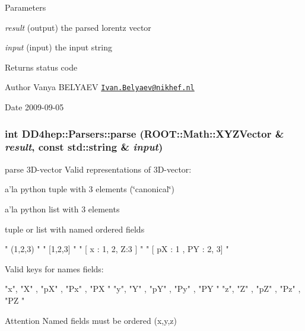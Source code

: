 \begin{DoxyParams}{Parameters}
\item[{\em result}](output) the parsed lorentz vector \item[{\em input}](input) the input string \end{DoxyParams}
\begin{DoxyReturn}{Returns}
status code 
\end{DoxyReturn}
\begin{DoxyAuthor}{Author}
Vanya BELYAEV \href{mailto:Ivan.Belyaev@nikhef.nl}{\tt Ivan.Belyaev@nikhef.nl} 
\end{DoxyAuthor}
\begin{DoxyDate}{Date}
2009-\/09-\/05 
\end{DoxyDate}
\hypertarget{namespace_d_d4hep_1_1_parsers_a55f47fe0c36c09f779f5aeefe17e9bcb}{
\subsubsection[{parse}]{\setlength{\rightskip}{0pt plus 5cm}int DD4hep::Parsers::parse (ROOT::Math::XYZVector \& {\em result}, \/  const std::string \& {\em input})}}
\label{namespace_d_d4hep_1_1_parsers_a55f47fe0c36c09f779f5aeefe17e9bcb}


parse 3D-\/vector Valid representations of 3D-\/vector:


\begin{DoxyItemize}
\item a'la python tuple with 3 elements (\char`\"{}canonical\char`\"{})
\item a'la python list with 3 elements
\item tuple or list with named ordered fields
\end{DoxyItemize}


\begin{DoxyCode}
    " (1,2,3) "
    " [1,2,3] "
    " [ x : 1, 2, Z:3 ] "
    " [ pX : 1 , PY : 2, 3] "
\end{DoxyCode}


Valid keys for names fields:


\begin{DoxyCode}
    "x", "X" , "pX" , "Px" , "PX "
    "y", "Y" , "pY" , "Py" , "PY "
    "z", "Z" , "pZ" , "Pz" , "PZ "
\end{DoxyCode}


\begin{DoxyAttention}{Attention}
Named fields must be ordered {\ttfamily (x,y,z)}
\end{DoxyAttention}

